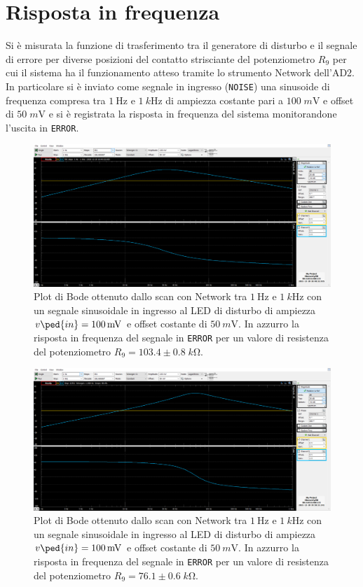 \documentclass[10pt, a4paper, italian]{article}
\begin{document}
\section{Risposta in frequenza}
Si è misurata la funzione di trasferimento tra il generatore di disturbo e
il segnale di errore per diverse posizioni del contatto strisciante del
potenziometro $R_9$ per cui il sistema ha il funzionamento atteso tramite
lo strumento Network dell'AD2.
In particolare si è inviato come segnale in ingresso (\verb+NOISE+) una
sinusoide di frequenza compresa tra $\SI{1}{\Hz}$ e $\SI{1}{k\Hz}$ di
ampiezza costante pari a $100 \; \si{m\V}$ e offset di $50 \; \si{m\V}$
e si è registrata la risposta in frequenza del sistema monitorandone l'uscita
in \verb+ERROR+.
\begin{figure}[htbp]
    \centering
	\includegraphics[width=\textwidth]{103.4k}
    \caption{Plot di Bode ottenuto dallo scan con Network tra $\SI{1}{\Hz}$ e
	$\SI{1}{k\Hz}$ con un segnale sinusoidale in ingresso al LED di disturbo di
	ampiezza $v\ped{in} = \SI{100}{m\V}$ e offset costante di $\SI{50}{m\V}$.
	In azzurro la risposta in frequenza del segnale in \texttt{ERROR} per un
	valore di resistenza del potenziometro $R_9 = 103.4 \pm 0.8 \; \si{k\ohm}$.
    \label{fig: netR103}}
\end{figure}
\begin{figure}[htbp]
    \centering
	\includegraphics[width=\textwidth]{76.1k}
    \caption{Plot di Bode ottenuto dallo scan con Network tra $\SI{1}{\Hz}$ e
	$\SI{1}{k\Hz}$ con un segnale sinusoidale in ingresso al LED di disturbo di
	ampiezza $v\ped{in} = \SI{100}{m\V}$ e offset costante di $\SI{50}{m\V}$.
	In azzurro la risposta in frequenza del segnale in \texttt{ERROR} per un
	valore di resistenza del potenziometro $R_9 = 76.1 \pm 0.6 \; \si{k\ohm}$.
    \label{fig: netR76}}
\end{figure}
\end{document}
